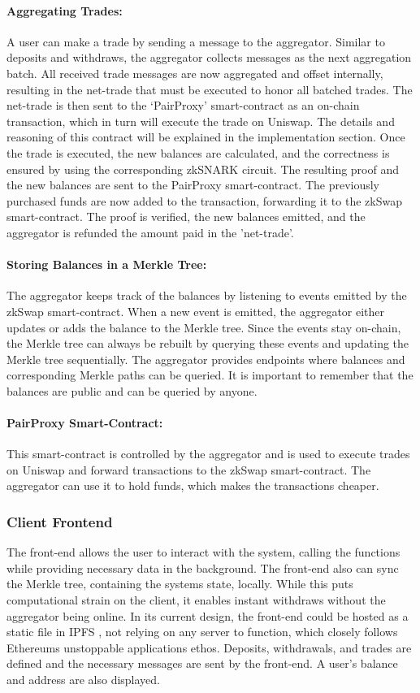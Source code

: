 \documentclass[../../thesis.tex]{subfiles}
\begin{document}
\paragraph{Aggregating Trades:}
A user can make a trade by sending a message to the aggregator. Similar to deposits and withdraws, the aggregator collects messages as the next aggregation batch. All received trade messages are now aggregated and offset internally, resulting in the net-trade that must be executed to honor all batched trades. The net-trade is then sent to the `PairProxy' smart-contract as an on-chain transaction, which in turn will execute the trade on Uniswap. The details and reasoning of this contract will be explained in the implementation section. Once the trade is executed, the new balances are calculated, and the correctness is ensured by using the corresponding zkSNARK circuit. The resulting proof and the new balances are sent to the PairProxy smart-contract. The previously purchased funds are now added to the transaction, forwarding it to the zkSwap smart-contract. The proof is verified, the new balances emitted, and the aggregator is refunded the amount paid in the 'net-trade'. 

\paragraph{Storing Balances in a Merkle Tree:}
The aggregator keeps track of the balances by listening to events emitted by the zkSwap smart-contract. When a new event is emitted, the aggregator either updates or adds the balance to the Merkle tree. Since the events stay on-chain, the Merkle tree can always be rebuilt by querying these events and updating the Merkle tree sequentially. The aggregator provides endpoints where balances and corresponding Merkle paths can be queried. It is important to remember that the balances are public and can be queried by anyone.

\paragraph{PairProxy Smart-Contract:}
This smart-contract is controlled by the aggregator and is used to execute trades on Uniswap and forward transactions to the zkSwap smart-contract. The aggregator can use it to hold funds, which makes the transactions cheaper. 

\subsubsection{Client Frontend}
The front-end allows the user to interact with the system, calling the functions while providing necessary data in the background. The front-end also can sync the Merkle tree, containing the systems state, locally. While this puts computational strain on the client, it enables instant withdraws without the aggregator being online. In its current design, the front-end could be hosted as a static file in IPFS \cite{benet2014ipfs}, not relying on any server to function, which closely follows Ethereums unstoppable applications ethos. Deposits, withdrawals, and trades are defined and the necessary messages are sent by the front-end. A user's balance and address are also displayed. 
\end{document}
